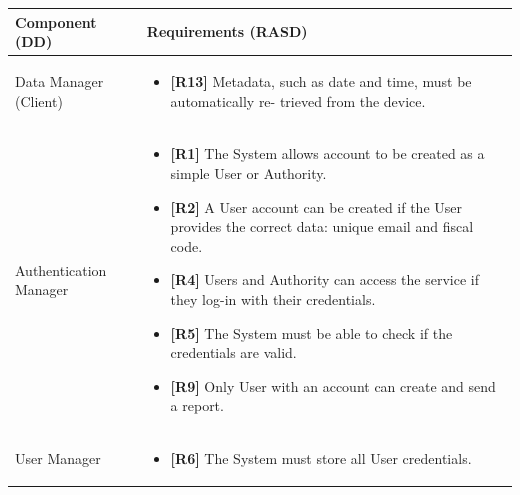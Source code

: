 \documentclass{article}
\begin{document}
	\begin{longtable}{| p{5 cm} | p{8 cm} |} \hline
		Component (DD) & Requirements (RASD)  \\ \hline
		\newline Data Manager (Client) & 
		\begin{itemize}
			\item {{\bf[R13]} Metadata, such as date and time, must be automatically re- trieved from the device.}
		\end{itemize}	\\ \hline
		\newline Authentication Manager & 
		\begin{itemize}
			\item  {{\bf[R1]} The System allows account to be created as a simple User or Authority.}
			\item  {{\bf [R2]} A User account can be created if the User provides the correct data: unique email and fiscal code.}
			\item  {{\bf [R4]} Users and Authority can access the service if they log-in with their credentials.}
			\item  {{\bf [R5]} The System must be able to check if the credentials are valid.
}
			\item  {{\bf [R9]} Only User with an account can create and send a report.}
		\end{itemize}		\\	 \hline	
		\newline User Manager  & 
		\begin{itemize}
			\item  {{\bf [R6]} The System must store all User credentials.}


\end{itemize}
\end{longtable}
\end{document}
